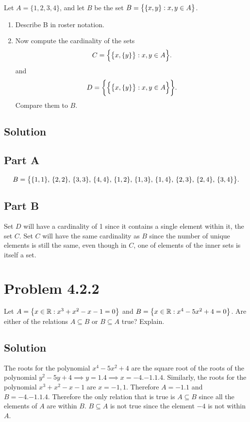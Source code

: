 \documentclass[12pt]{extarticle}
\begin{document}
Let $A = \{ 1,2,3,4 \}$, and let $B$ be the set $B = \qty\big{ \{x, y\} : x, y \in  A }$. 
\begin{enumerate}[label=(\alph*)]
	\item Describe B in roster notation. 
	\item Now compute the cardinality of the sets
		\[
			C = \qty\Big{ \qty\big{ x, \{ y \} } : x,y \in A }
		.\]
		and
		\[
			D = \qty\bigg{\qty\Big{ \qty\big{ x, \{ y \} } : x,y \in A }}
		.\]
		Compare them to $B$.
\end{enumerate}

\subsection*{Solution}

\subsection*{Part A}

\[
	B = \qty\big{
		\qty{1,1},\,
		\qty{2,2},\,
		\qty{3,3},\,
		\qty{4,4},\,
		\qty{1,2},\,
		\qty{1,3},\,
		\qty{1,4},\,
		\qty{2,3},\,
		\qty{2,4},\,
		\qty{3,4}
	}
.\]

\subsection*{Part B}

Set $D$ will have a cardinality of 1 since it contains a single element within it, the set $C$. Set $C$ will have the same cardinality as $B$ since the number of unique elements is still the same, even though in $C$, one of elements of the inner sets is itself a set.

\section*{Problem 4.2.2}

Let $A = \qty{x \in \mathbb{R} : x^3 + x^2 - x - 1 = 0}$ and $B = \qty{x \in \mathbb{R} : x^4 - 5x^2 + 4 = 0}$. Are either of the relations $A \subseteq B$ or $B \subseteq A$ true? Explain.

\subsection*{Solution}

The roots for the polynomial $x^{4} - 5x^2 + 4$ are the square root of the roots of the polynomial $y^2 - 5y + 4 \implies y = \qty{ 1, 4 } \implies x = \qty{ -4, -1, 1, 4 }$. Similarly, the roots for the polynomial $x^3 + x^2 - x - 1$ are $x = {-1, 1}$. Therefore $A = \qty{ -1, 1 }$ and $B = \qty{-4, -1, 1, 4}$. Therefore the only relation that is true is $A \subseteq B$ since all the elements of $A$ are within $B$. $B \subseteq A$ is not true since the element $-4$ is not within $A$.
\end{document}
